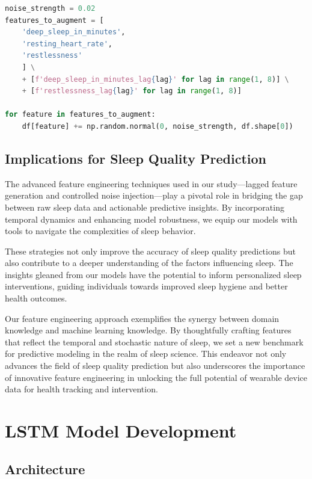 \documentclass[10pt]{extarticle}
\begin{document}
\begin{lstlisting}[language=Python]
noise_strength = 0.02
features_to_augment = [
    'deep_sleep_in_minutes',
    'resting_heart_rate',
    'restlessness'
    ] \
    + [f'deep_sleep_in_minutes_lag{lag}' for lag in range(1, 8)] \
    + [f'restlessness_lag{lag}' for lag in range(1, 8)]

for feature in features_to_augment:
    df[feature] += np.random.normal(0, noise_strength, df.shape[0])
\end{lstlisting}

\subsection{Implications for Sleep Quality Prediction}

The advanced feature engineering techniques used in our study—lagged feature generation and controlled noise injection—play a pivotal role in bridging the gap between raw sleep data and actionable predictive insights. By incorporating temporal dynamics and enhancing model robustness, we equip our models with tools to navigate the complexities of sleep behavior.

These strategies not only improve the accuracy of sleep quality predictions but also contribute to a deeper understanding of the factors influencing sleep. The insights gleaned from our models have the potential to inform personalized sleep interventions, guiding individuals towards improved sleep hygiene and better health outcomes.

Our feature engineering approach exemplifies the synergy between domain knowledge and machine learning knowledge. By thoughtfully crafting features that reflect the temporal and stochastic nature of sleep, we set a new benchmark for predictive modeling in the realm of sleep science. This endeavor not only advances the field of sleep quality prediction but also underscores the importance of innovative feature engineering in unlocking the full potential of wearable device data for health tracking and intervention.

\section{LSTM Model Development}

\subsection{Architecture}
\end{document}
